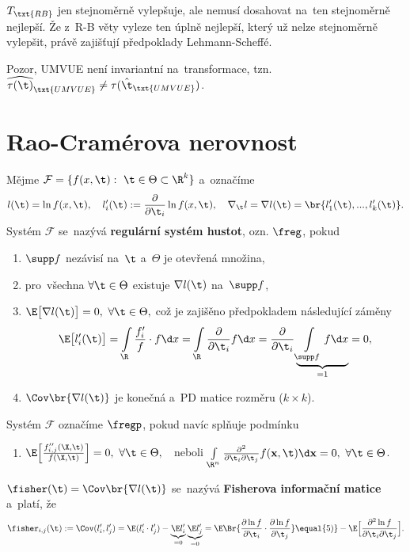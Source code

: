 \begin{remark}
	$T_\txt{RB}$ jen stejnoměrně vylepšuje, ale nemusí dosahovat na~ten stejnoměrně nejlepší. Že z~R-B věty vyleze ten úplně nejlepší, který už nelze stejnoměrně vylepšit, právě zajišťují předpoklady Lehmann-Scheffé.
	
		Pozor, UMVUE není invariantní na~transformace, tzn. $\widehat{\tau(\t)}_\txt{UMVUE}\neq\tau(\hat{\t}_\txt{UMVUE})$.
\end{remark}
\section{Rao-Cramérova nerovnost}
\begin{define}\label{reghustoty}
	Mějme $\mathcal{F}=\{ f(x,\t):~\t\in\Theta\subset\R^k \}$ a~označíme $$l(\t)=\ln f(x,\t),\quad l'_i(\t):=\frac{\partial}{\partial \t_i}\ln f(x,\t),\quad \nabla_\t l=\nabla l(\t)=\br{l'_1(\t),...,l'_k(\t)}.$$
	Systém $\mathcal{F}$ se~nazývá \textbf{regulární systém hustot}, ozn. $\freg$, pokud\begin{enumerate}[\quad1)]
			\item $\supp f$ nezávisí na~$\t$ a~$\Theta$ je otevřená množina,
			\item pro~všechna $\forall\t\in\Theta$ existuje $\nabla l(\t)$ na~$\supp f$,
			\item $\E\big[\nabla l(\t)\big]=0,~ \forall\t\in\Theta,$ což je zajišěno předpokladem následující záměny$$\E\big[l'_i(\t)\big]=\int\limits_{\R}\frac{f_i'}{f}\cdot f\d x=\int\limits_{\R}\frac{\partial}{\partial\t_i}f\d x=\frac{\partial}{\partial\t_i}\underbrace{\int\limits_{\supp f} f\d x}_{=1}=0,$$
			\item $\Cov\br{\nabla l(\t)}$ je konečná a~PD matice rozměru ($k\times k$).
		\end{enumerate}
		Systém $\mathcal{F}$ označíme $\fregp$, pokud navíc splňuje podmínku\begin{enumerate}[\quad5)]
			\item $\E\Big[\frac{f_{i,j}''(\X,\t)}{f(\X,\t)} \Big]=0,~\forall\t\in\Theta,\quad$neboli $\int\limits_{\R^n}\frac{\partial^2}{\partial\t_i\partial\t_j}f(\textbf{x},\t)\d\textbf{x}=0,~\forall\t\in\Theta$.
		\end{enumerate}
\end{define}
\begin{define}
	$\fisher(\t)=\Cov\br{\nabla l(\t)}$ se~nazývá \textbf{Fisherova informační matice} a~platí, že 
	$$ \fisher_{i,j}(\t):=\Cov(l'_i,l'_j)=\E(l'_i\cdot l'_j)-\underbrace{\E l'_i}_{=0}\underbrace{\E l'_j}_{=0}=\E\Br{\frac{\partial\ln f}{\partial\t_i}\cdot \frac{\partial\ln f}{\partial\t_j}}\equal{5)}-\E\Big[ \frac{\partial^2 \ln f}{\partial\t_i\partial\t_j} \Big]. $$
	
\end{define}
